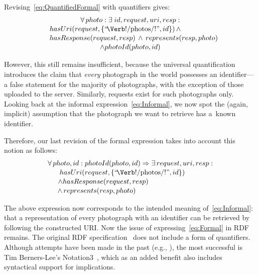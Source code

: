 \documentclass[runningheads,a4paper, twocolumn]{llncs}
\begin{document}
Revising~\ref{eq:QuantifiedFormal} with quantifiers gives:
\begin{multline}\label{eq:QuantifiedFormal}
    \makebox[4.4cm]{$\forall\, photo : \exists\; id, request, uri, resp :$} \\[-.2em]
    \shoveleft{hasUri(request, \{\mbox{``\!\Verb!/photos/!''}, id\})\, \land} \\[-.2em]
    \shoveleft{hasResponse(request, resp) \,\land\, represents(resp, photo)}\\[-.2em]
    \land photoId(photo, id)
\end{multline}

\noindent However, this still remains insufficient, because the universal quantification introduces the claim that \emph{every} photograph in the world possesses an identifier---a false statement for the majority of photographs, with the exception of those uploaded to the server. Similarly, requests exist for such photographs only. Looking back at the informal expression~\ref{eq:Informal}, we now spot the (again, implicit) assumption that the photograph we want to retrieve has a~known identifier.

Therefore, our last revision of the formal expression takes into account this notion as follows:
\begin{multline}\label{eq:Formal}
    \makebox[7.8cm]{$\forall\, photo, id : photoId(photo, id) \Rightarrow
                    \exists\, request, uri, resp :$}\\[-.2em]
    \shoveleft{hasUri(request, \{\mbox{``\!\Verb!/photos/!''}, id\})} \\[-.2em]
    \shoveleft{\land hasResponse(request, resp)} \\[-.2em]
    \land\, represents(resp, photo)\makebox[3.38cm]{}
\end{multline}

The above expression now corresponds to the intended meaning of~\ref{eq:Informal}: that a representation of every photograph with an identifier can be retrieved by following the constructed URI. Now the issue of expressing~\ref{eq:Formal} in RDF remains. The original RDF specification~\cite{RDF} does not include a form of quantifiers. Although attempts have been made in the past (e.g., \cite{RDFQuantifiers}), the most successful is Tim Berners-Lee's Notation3~\cite{Notation3}, which as an added benefit also includes syntactical support for implications.
\end{document}
